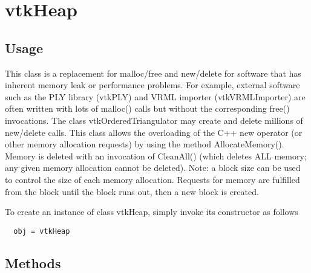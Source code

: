 \section{vtkHeap}

\subsection{Usage}

 This class is a replacement for malloc/free and new/delete for software
 that has inherent memory leak or performance problems. For example,
 external software such as the PLY library (vtkPLY) and VRML importer
 (vtkVRMLImporter) are often written with lots of malloc() calls but
 without the corresponding free() invocations. The class
 vtkOrderedTriangulator may create and delete millions of new/delete calls.
 This class allows the overloading of the C++ new operator (or other memory
 allocation requests) by using the method AllocateMemory(). Memory is
 deleted with an invocation of CleanAll() (which deletes ALL memory; any
 given memory allocation cannot be deleted). Note: a block size can be used
 to control the size of each memory allocation. Requests for memory are
 fulfilled from the block until the block runs out, then a new block is
 created.


To create an instance of class vtkHeap, simply
invoke its constructor as follows
\begin{verbatim}
  obj = vtkHeap
\end{verbatim}
\subsection{Methods}

